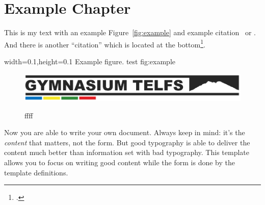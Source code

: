 
\chapter{Example Chapter}

This is my text with an example Figure~\ref{fig:example} and example
citation~\cite{StrunkWhite} or \textcite{Bringhurst1993}. And there is another
\enquote{citation} which is located at the bottom\footcite{tagstore}.

  {width=0.1\textwidth,height=0.1\textheight}%
  {Example figure.}%
  {test}%
  {fig:example}%

\begin{figure}[hbtp]
\caption[Caption 1]{ffff}
\centering
\includegraphics[scale=0.5]{figures/institution.png}
\label{fig:test}
\end{figure}

Now you are able to write your own document. Always keep in mind: it's
the \emph{content} that matters, not the form. But good typography is
able to deliver the content much better than information set with bad
typography. This template allows you to focus on writing good content
while the form is done by the template definitions. \cite{tagstore}

